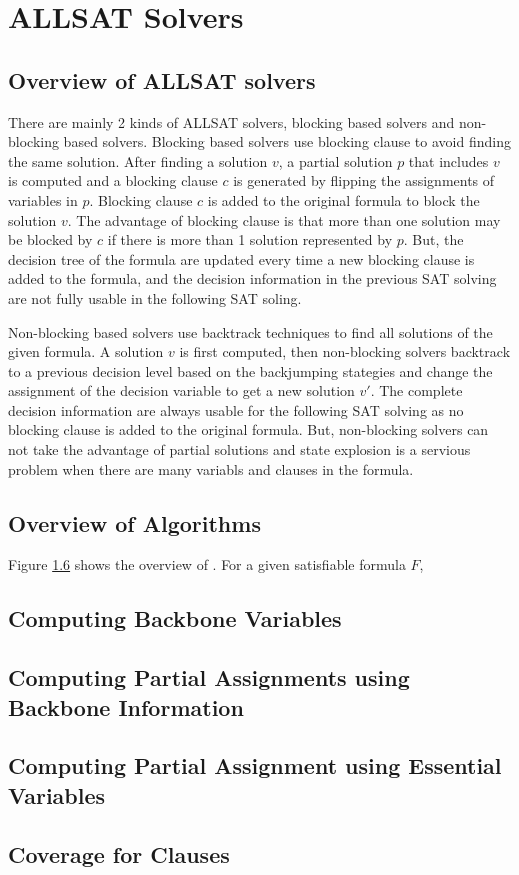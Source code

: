 \section{ALLSAT Solvers} \label{sec:meth}
\subsection{Overview of ALLSAT solvers}
There are mainly 2 kinds of ALLSAT solvers, blocking based solvers and non-blocking based solvers.
Blocking based solvers use blocking clause to avoid finding the same solution. After finding a solution $v$, a partial solution $p$ that includes $v$ is computed and a blocking clause $c$ is generated by flipping the assignments of variables in $p$. Blocking clause $c$ is added to the original formula to block the solution $v$. The advantage of blocking clause is that more than one solution may be blocked by $c$ if there is more than 1 solution represented by $p$. But, the decision tree of the formula are updated every time a new blocking clause is added to the formula, and the decision information in the previous SAT solving are not fully usable in the following SAT soling.

Non-blocking based solvers use backtrack techniques to find all solutions of the given formula. A solution $v$ is first computed, then non-blocking solvers backtrack to a previous decision level based on the backjumping stategies and change the assignment of the decision variable to get a new solution $v'$. The complete decision information are always usable for the following SAT solving as no blocking clause is added to the original formula. But, non-blocking solvers can not take the advantage of partial solutions and state explosion is a servious problem when there are many variabls and clauses in the formula.
\subsection{Overview of Algorithms}
Figure \ref{} shows the overview of \tool. For a given satisfiable formula $F$, 

\subsection{Computing Backbone Variables}

\subsection{Computing Partial Assignments using Backbone Information}

\subsection{Computing Partial Assignment using Essential Variables}

\subsection{Coverage for Clauses}


